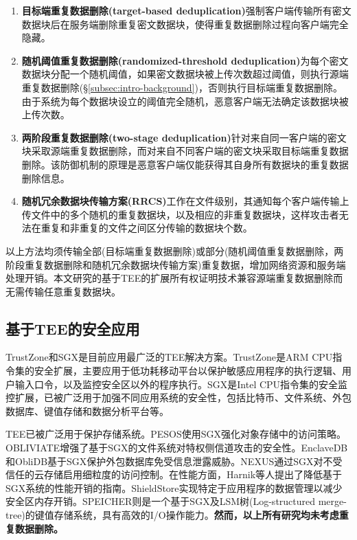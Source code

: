 \begin{enumerate}[leftmargin=*]
    \item \textbf{目标端重复数据删除(target-based deduplication)}\cite{harnik2010side}强制客户端传输所有密文数据块后在服务端删除重复密文数据块，使得重复数据删除过程向客户端完全隐藏。
    \item \textbf{随机阈值重复数据删除(randomized-threshold deduplication)}\cite{harnik2010side}为每个密文数据块分配一个随机阈值，如果密文数据块被上传次数超过阈值，则执行源端重复数据删除(\S\ref{subsec:intro-background})，否则执行目标端重复数据删除。由于系统为每个数据块设立的阈值完全随机，恶意客户端无法确定该数据块被上传次数。
    \item \textbf{两阶段重复数据删除(two-stage deduplication)}\cite{li2015cdstore}针对来自同一客户端的密文块采取源端重复数据删除，而对来自不同客户端的密文块采取目标端重复数据删除。该防御机制的原理是恶意客户端仅能获得其自身所有数据块的重复数据删除信息。
    \item \textbf{随机冗余数据块传输方案(RRCS)}\cite{zuo2018mitigating}工作在文件级别，其通知每个客户端传输上传文件中的多个随机的重复数据块，以及相应的非重复数据块，这样攻击者无法在重复和非重复的文件之间区分传输的数据块个数。
\end{enumerate}

以上方法均须传输全部(目标端重复数据删除)或部分(随机阈值重复数据删除，两阶段重复数据删除和随机冗余数据块传输方案)重复数据，增加网络资源和服务端处理开销。本文研究的基于TEE的扩展所有权证明技术兼容源端重复数据删除而无需传输任意重复数据块。

\subsection{基于TEE的安全应用}
\label{subsec:compare-tee}

TrustZone和SGX是目前应用最广泛的TEE解决方案\cite{pinto19}。TrustZone是ARM CPU指令集的安全扩展，主要应用于低功耗移动平台以保护敏感应用程序的执行逻辑\cite{rubinov2016automated}、用户输入口令\cite{ying2018truz}，以及监控安全区以外的程序执行\cite{azab2014hypervision}。SGX是Intel CPU指令集的安全监控扩展，已被广泛用于加强不同应用系统的安全性，包括比特币\cite{matetic19BITE}、文件系统\cite{ahmad2018OBLIVIATE,shinde20}、外包数据库\cite{eskandarian19,priebe18,sun21}、键值存储\cite{mishra2018Oblix,bailleu2019SPEICHER,kim2019ShieldStore,bailleu2021Avocado}和数据分析平台\cite{schuster15, zheng2017Opaque, bowe2020ZEXE}等。

TEE已被广泛用于保护存储系统。PESOS\cite{krahn2018PESOS}使用SGX强化对象存储中的访问策略。OBLIVIATE\cite{ahmad2018OBLIVIATE}增强了基于SGX的文件系统对特权侧信道攻击的安全性。EnclaveDB\cite{priebe18}和ObliDB\cite{eskandarian19}基于SGX保护外包数据库免受信息泄露威胁。NEXUS\cite{djoko2019NEXUS}通过SGX对不受信任的云存储启用细粒度的访问控制。在性能方面，Harnik等人\cite{harnik2018SGX}提出了降低基于SGX系统的性能开销的指南。ShieldStore\cite{kim2019ShieldStore}实现特定于应用程序的数据管理以减少安全区内存开销。SPEICHER\cite{bailleu2019SPEICHER}则是一个基于SGX及LSM树(Log-structured merge-tree)\cite{LSMT}的键值存储系统，具有高效的I/O操作能力。\textbf{然而，以上所有研究均未考虑重复数据删除。}

